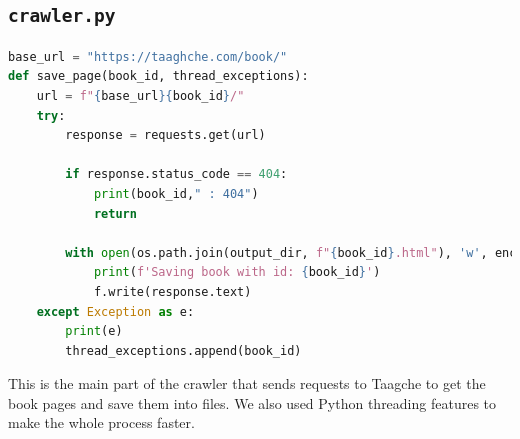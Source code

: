 \documentclass{solutionclass} %
\def\co#1{\texttt{#1}}
\begin{document}
\subsection*{\co{crawler.py}}
\begin{lstlisting}[language=Python]
base_url = "https://taaghche.com/book/"
def save_page(book_id, thread_exceptions):
	url = f"{base_url}{book_id}/"
	try:
		response = requests.get(url)
		
		if response.status_code == 404:
			print(book_id," : 404")
			return
		
		with open(os.path.join(output_dir, f"{book_id}.html"), 'w', encoding='utf-8') as f:
			print(f'Saving book with id: {book_id}')
			f.write(response.text)
	except Exception as e:
		print(e)
		thread_exceptions.append(book_id)

    \end{lstlisting}
\begin{solution}
    This is the main part of the crawler that sends requests to Taagche to get the book pages and save them into files. We also used Python threading features to make the whole process faster.

\end{solution}
\end{document}
